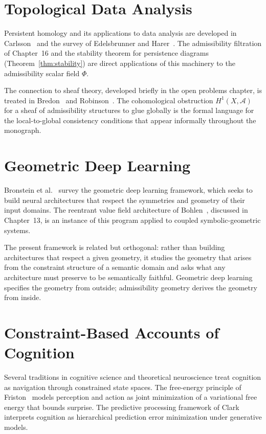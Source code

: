 \documentclass[12pt, oneside]{book}
\theoremstyle{plain-flyxion}
\theoremstyle{definition-flyxion}
\begin{document}
\section{Topological Data Analysis}

Persistent homology and its applications to data analysis are developed in Carlsson~\cite{carlsson2009}
and the survey of Edelsbrunner and Harer~\cite{edelsbrunner2010}. The admissibility
filtration of Chapter~16 and the stability theorem for persistence diagrams
(Theorem~\ref{thm:stability}) are direct applications of this machinery to the
admissibility scalar field $\Phi$.

The connection to sheaf theory, developed briefly in the open problems chapter, is treated
in Bredon~\cite{bredon1997} and Robinson~\cite{robinson2014}. The cohomological
obstruction $H^1(X, \mathcal{A})$ for a sheaf of admissibility structures to glue
globally is the formal language for the local-to-global consistency conditions that
appear informally throughout the monograph.

\section{Geometric Deep Learning}

Bronstein et al.~\cite{bronstein2021} survey the geometric deep learning framework,
which seeks to build neural architectures that respect the symmetries and geometry of
their input domains. The reentrant value field architecture of Bohlen~\cite{bohlen2026},
discussed in Chapter~13, is an instance of this program applied to coupled
symbolic-geometric systems.

The present framework is related but orthogonal: rather than building architectures that
respect a given geometry, it studies the geometry that arises from the constraint
structure of a semantic domain and asks what any architecture must preserve to be
semantically faithful. Geometric deep learning specifies the geometry from outside;
admissibility geometry derives the geometry from inside.

\section{Constraint-Based Accounts of Cognition}

Several traditions in cognitive science and theoretical neuroscience treat cognition as
navigation through constrained state spaces. The free-energy principle of Friston~\cite{friston2010}
models perception and action as joint minimization of a variational free energy that
bounds surprise. The predictive processing framework of Clark~\cite{clark2016} interprets
cognition as hierarchical prediction error minimization under generative models.
\end{document}
